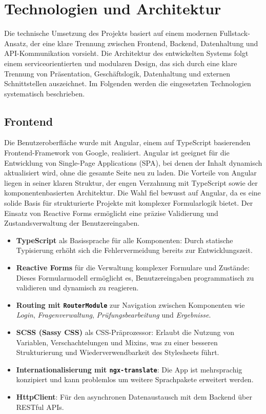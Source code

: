 \documentclass[a4paper,12pt]{article}
\begin{document}
\newpage

\section{Technologien und Architektur}
Die technische Umsetzung des Projekts basiert auf einem modernen Fullstack-Ansatz, der eine klare Trennung zwischen Frontend, Backend, Datenhaltung und API-Kommunikation vorsieht. Die Architektur des entwickelten Systems folgt einem serviceorientierten und modularen Design, das sich durch eine klare Trennung von Präsentation, Geschäftslogik, Datenhaltung und externen Schnittstellen auszeichnet. Im Folgenden werden die eingesetzten Technologien systematisch beschrieben.
\subsection{Frontend}
Die Benutzeroberfläche wurde mit Angular, einem auf TypeScript basierenden Frontend-Framework von Google, realisiert. Angular ist geeignet für die Entwicklung von Single-Page Applications (SPA), bei denen der Inhalt dynamisch aktualisiert wird, ohne die gesamte Seite neu zu laden. Die Vorteile von Angular liegen in seiner klaren Struktur, der engen Verzahnung mit TypeScript sowie der komponentenbasierten Architektur. Die Wahl fiel bewusst auf Angular, da es eine solide Basis für strukturierte Projekte mit komplexer Formularlogik bietet. Der Einsatz von Reactive Forms ermöglicht eine präzise Validierung und Zustandsverwaltung der Benutzereingaben.


\begin{itemize}
    \item \textbf{TypeScript} als Basissprache für alle Komponenten: Durch statische Typisierung erhöht sich die Fehlervermeidung bereits zur Entwicklungszeit.
    
    \item \textbf{Reactive Forms} für die Verwaltung komplexer Formulare und Zustände: Dieses Formularmodell ermöglicht es, Benutzereingaben programmatisch zu validieren und dynamisch zu reagieren.
    
    \item \textbf{Routing mit \texttt{RouterModule}} zur Navigation zwischen Komponenten wie \textit{Login}, \textit{Fragenverwaltung}, \textit{Prüfungsbearbeitung} und \textit{Ergebnisse}.
    
    \item \textbf{SCSS (Sassy CSS)} als CSS-Präprozessor: Erlaubt die Nutzung von Variablen, Verschachtelungen und Mixins, was zu einer besseren Strukturierung und Wiederverwendbarkeit des Stylesheets führt.
    
    \item \textbf{Internationalisierung mit \texttt{ngx-translate}}: Die App ist mehrsprachig konzipiert und kann problemlos um weitere Sprachpakete erweitert werden.
    
    \item \textbf{HttpClient}: Für den asynchronen Datenaustausch mit dem Backend über RESTful APIs.
\end{itemize}
\end{document}
